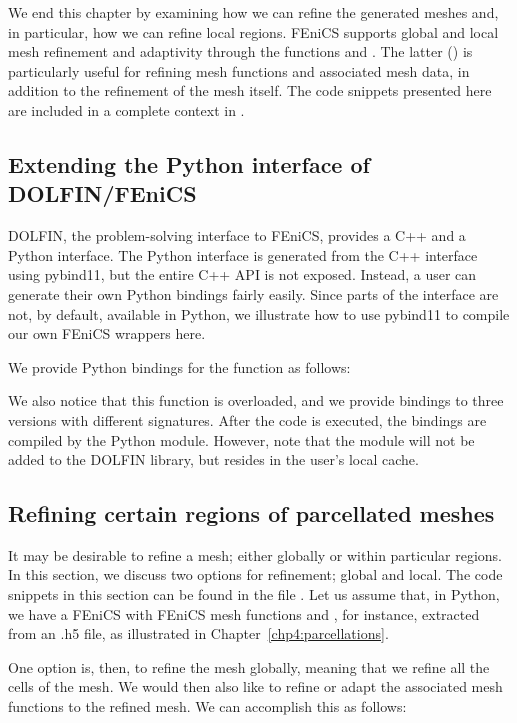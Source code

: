 We end this chapter by examining how we can refine the generated
meshes and, in particular, how we can refine local regions. FEniCS
supports global and local mesh refinement and adaptivity through the
functions  and . The latter
() is particularly useful for refining mesh
functions and associated mesh data, in addition to the refinement of
the mesh itself. The code snippets presented here are included in
a complete context in . 

\subsection{Extending the Python interface of DOLFIN/FEniCS}
DOLFIN, the problem-solving interface to FEniCS, provides a C++ and a
Python interface. The Python interface is generated from the C++
interface using pybind11, but the entire C++ API is not
exposed. Instead, a user can generate their own Python bindings fairly
easily. Since parts of the  interface are not, by
default, available in Python, we illustrate how to use pybind11 to
compile our own FEniCS wrappers here.

We provide Python bindings for the  function as follows: 

We also notice that this function is overloaded, and we provide
bindings to three versions with different signatures. After the code is
executed, the bindings are compiled by the Python module. However,
note that the module will not be added to the DOLFIN library, but
resides in the user's local cache.

\subsection{Refining certain regions of parcellated meshes}
It may be desirable to refine a mesh; either globally or within particular 
regions.  In this section, we discuss two options for refinement; global and 
local.  The code snippets in this section can be found in the file 
.  Let us assume that, 
in Python, we have a FEniCS  with FEniCS mesh functions 
 and , for instance, extracted from an .h5 file, 
as illustrated in Chapter~\ref{chp4:parcellations}. 

One option is, then, to refine the mesh globally, meaning that we refine
all the cells of the mesh. We would then also like to refine or adapt the
associated mesh functions to the refined mesh. We can accomplish this
as follows:

